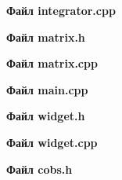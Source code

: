 \documentclass[14pt,a4paper]{extreport}
\begin{document}
\textbf{Файл integrator.cpp}
\begin{alltt}
    
\end{alltt}

\textbf{Файл matrix.h}
\begin{alltt}
    
\end{alltt}

\textbf{Файл matrix.cpp}
\begin{alltt}
    
\end{alltt}

\textbf{Файл main.cpp}
\begin{alltt}
    
\end{alltt}

\textbf{Файл widget.h}
\begin{alltt}
    
\end{alltt}

\textbf{Файл widget.cpp}
\begin{alltt}
    
\end{alltt}

\textbf{Файл cobs.h}
\begin{alltt}
    
\end{alltt}
\end{document}
